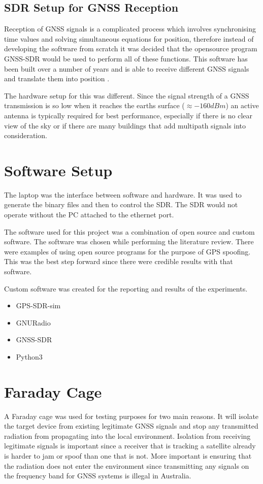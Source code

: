 \subsection{SDR Setup for GNSS Reception}
Reception of GNSS signals is a complicated process which involves synchronising time values and solving simultaneous equations for position, therefore instead of
developing the software from scratch it was decided that
the opensource program GNSS-SDR would be used to perform all of these functions. This software has been built over a number of years and is able to receive different GNSS
signals and translate them into position \cite{RN16}.

The hardware setup for this was different. Since the signal strength of a GNSS transmission is so low when it reaches the earths surface ($\approx -160dBm$) an active
antenna is typically required for best performance, especially if there is no clear view of the sky or if there are many buildings that add multipath signals into
consideration.

\section{Software Setup}
The laptop was the interface between software and hardware. It was used to generate the binary files and then to control the SDR. The SDR would not operate without the
PC attached to the ethernet port.

The software used for this project was a combination of open source and custom software. 
The software was chosen while performing the literature review. There were examples \cite{RN4} \cite{RN28} of using open source programs
for the purpose of GPS spoofing. This was the best step forward since there were credible results with that software.

Custom software was created for the reporting and results of the experiments. 

\begin{itemize}
    \item GPS-SDR-sim
    \item GNURadio
    \item GNSS-SDR
    \item Python3
\end{itemize}

\section{Faraday Cage} \label{sec:FaraCage}
A Faraday cage was used for testing purposes for two main reasons. It will isolate the target device from existing legitimate GNSS signals and stop any transmitted
radiation from propagating into the local environment. Isolation from receiving legitimate signals is important since a receiver that is tracking a satellite already is
harder to jam or spoof than one that is not. More important is ensuring that the radiation does not enter the environment since transmitting any signals on the frequency
band for GNSS systems is illegal in Australia. 

